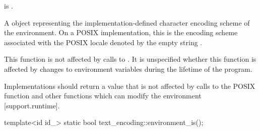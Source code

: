 \documentclass{wg21}
\begin{document}
\begin{addedblock}
\begin{itemdescr}
\mandates {} is .    
 
\returns A  object representing the implementation-defined character encoding scheme of the environment.
On a POSIX implementation, this is the encoding scheme associated with the POSIX locale denoted by the empty string .

\begin{note}
    This function is not affected by calls to .
    It is unspecified whether this function is affected by changes to environment variables during the lifetime of the program.
\end{note}

\recommended Implementations should return a value that is not affected by calls to the POSIX function 
and other functions which can modify the environment [support.runtime].

%
%
%
%    
%
%
%
%

\end{itemdescr}

\begin{itemdecl}
template<id id_>
static bool text_encoding::environment_is();
\end{itemdecl}


\end{addedblock}
\end{document}
